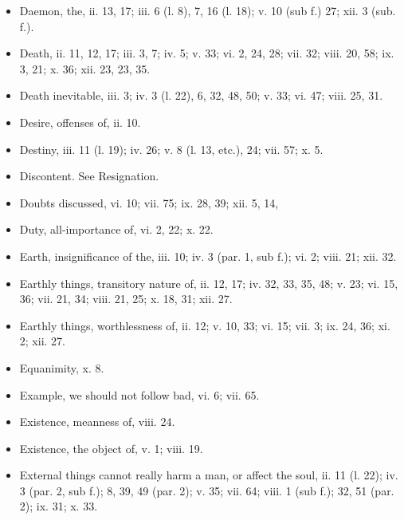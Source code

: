 \begin{itemize}[leftmargin=*]
\setlength\itemsep{0em}
\item
  Daemon, the, ii. 13, 17; iii. 6 (l. 8), 7, 16 (l. 18); v. 10 (sub f.)
  27; xii. 3 (sub. f.).
\item
  Death, ii. 11, 12, 17; iii. 3, 7; iv. 5; v. 33; vi. 2, 24, 28; vii.
  32; viii. 20, 58; ix. 3, 21; x. 36; xii. 23, 23, 35.
\item
  Death inevitable, iii. 3; iv. 3 (l. 22), 6, 32, 48, 50; v. 33; vi. 47;
  viii. 25, 31.
\item
  Desire, offenses of, ii. 10.
\item
  Destiny, iii. 11 (l. 19); iv. 26; v. 8 (l. 13, etc.), 24; vii. 57; x.
  5.
\item
  Discontent. See Resignation.
\item
  Doubts discussed, vi. 10; vii. 75; ix. 28, 39; xii. 5, 14,
\item
  Duty, all-importance of, vi. 2, 22; x. 22.
\end{itemize}

\begin{itemize}[leftmargin=*]
\setlength\itemsep{0em}
\item
  Earth, insignificance of the, iii. 10; iv. 3 (par. 1, sub f.); vi. 2;
  viii. 21; xii. 32.
\item
  Earthly things, transitory nature of, ii. 12, 17; iv. 32, 33, 35, 48;
  v. 23; vi. 15, 36; vii. 21, 34; viii. 21, 25; x. 18, 31; xii. 27.
\item
  Earthly things, worthlessness of, ii. 12; v. 10, 33; vi. 15; vii. 3;
  ix. 24, 36; xi. 2; xii. 27.
\item
  Equanimity, x. 8.
\item
  Example, we should not follow bad, vi. 6; vii. 65.
\item
  Existence, meanness of, viii. 24.
\item
  Existence, the object of, v. 1; viii. 19.
\item
  External things cannot really harm a man, or affect the soul, ii. 11
  (l. 22); iv. 3 (par. 2, sub f.); 8, 39, 49 (par. 2); v. 35; vii. 64;
  viii. 1 (sub f.); 32, 51 (par. 2); ix. 31; x. 33.
\end{itemize}

